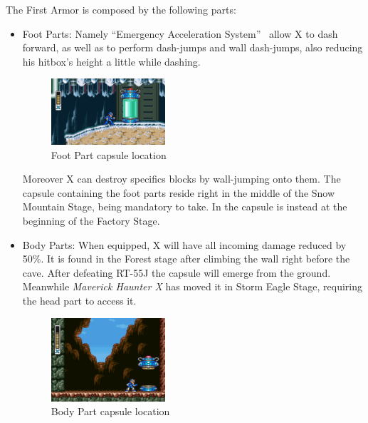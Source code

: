 The First Armor is composed by the following parts:
\begin{itemize}
	\item Foot Parts:	Namely ``Emergency Acceleration System''~\cite{X:Manual} allow X to dash forward, as well as to perform dash-jumps and wall dash-jumps, also reducing his hitbox's height a little while dashing.
	\begin{figure}[htp]
		\centering
		\includegraphics[width=0.4\textwidth]{figures/X1/Chill_penguin/Armor_foot.jpg}
		\caption{Foot Part capsule location}
	\end{figure}
	Moreover X can destroy specifics blocks by wall-jumping onto them. The capsule containing the foot parts reside right in the middle of the Snow Mountain Stage, being mandatory to take. In \mhx the capsule is instead at the beginning of the Factory Stage.
	
	
	\item Body Parts: When equipped, X will have all incoming damage reduced by 50\%. It is found in the Forest stage after climbing the wall right before the cave. After defeating RT-55J the capsule will emerge from the ground. Meanwhile \textit{Maverick Haunter X} has moved it in Storm Eagle Stage, requiring the head part to access it.
	\begin{figure}[htp]
		\centering
		\includegraphics[width=0.4\textwidth]{figures/X1/Sting_chameleon/Sting_armor_capsule.jpg}
		\caption{Body Part capsule location}
	\end{figure}
	

\end{itemize}
